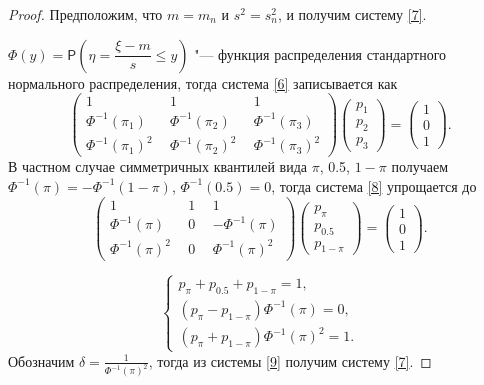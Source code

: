 \documentclass[12pt]{article}
\begin{document}
	\begin{proof}
		Предположим, что $m=m_{n}$ и $s^{2} = s_{n}^{2}$, и получим систему \eqref{7}.
		
		$\Phi (y) = \mathsf{P}(\eta = \dfrac{\xi-m}{s}\leq y)$ "--- функция распределения стандартного нормального распределения, тогда система \eqref{6} записывается как
		\begin{equation}
			\begin{pmatrix} 1&1&1\\ 
				\Phi^{-1}(\pi_{1})~~ &  \Phi ^{-1}(\pi_{2})~~  & \Phi ^{-1}(\pi_{3}) \\ 
				\Phi ^{-1}(\pi_{1})^{2}~~&\Phi ^{-1}(\pi_{2})^{2}~~  &\Phi ^{-1}(\pi_{3})^{2}
			\end{pmatrix}
			\begin{pmatrix}p_{1}\\p_{2}\\ p_{3}\end{pmatrix}= \begin{pmatrix}1\\0\\1\end{pmatrix}. \label{8}
		\end{equation}
		В частном случае симметричных квантилей вида $\pi$, 0.5, $1-\pi$ получаем $\Phi ^{-1}(\pi ) = -\Phi ^{-1}(1-\pi )$, $\Phi ^{-1}(0.5) = 0$, тогда система \eqref{8} упрощается до
	\begin{equation*}
		\begin{pmatrix} 1&1&1\\ 
			\Phi^{-1}(\pi)~~ &  0~~  & -\Phi ^{-1}(\pi) \\ 
			\Phi ^{-1}(\pi)^{2}~~& 0~~  &\Phi ^{-1}(\pi)^{2}
		\end{pmatrix} 
		\begin{pmatrix}p_{\pi}\\p_{0.5}\\ p_{1-\pi}\end{pmatrix}= \begin{pmatrix}1\\0\\1\end{pmatrix}.
	\end{equation*}
	
	\begin{equation}
		\begin{cases}
			p_{\pi}+p_{0.5}+p_{1-\pi} =1,\\ 
			(p_{\pi}-p_{1-\pi})\Phi ^{-1}(\pi) =0,\\ 
			(p_{\pi}+p_{1-\pi})\Phi ^{-1}(\pi)^{2}=1.
		\end{cases}\label{9}
	\end{equation}
Обозначим $\delta  = \displaystyle{\frac{1}{\Phi ^{-1}(\pi)^{2}}}$, тогда из системы \eqref{9} получим систему \eqref{7}.
	\end{proof}
	
\end{document}
